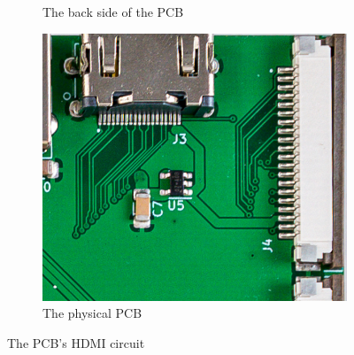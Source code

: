 \begin{figure}[t]
\begin{subfigure}{.33\textwidth}
    \caption{The back side of the PCB}
    \label{fig:HDMICircuitBack}
  \end{subfigure}%
  \begin{subfigure}{.33\textwidth}
    \centering
    \includegraphics[width=1\linewidth]{Figures/pcb/crops/hdmi}
    \caption{The physical PCB}
    \label{fig:HDMICircuitReal}
  \end{subfigure}
  \caption{The PCB's HDMI circuit}
  \label{fig:HDMICircuit}
\end{figure}


